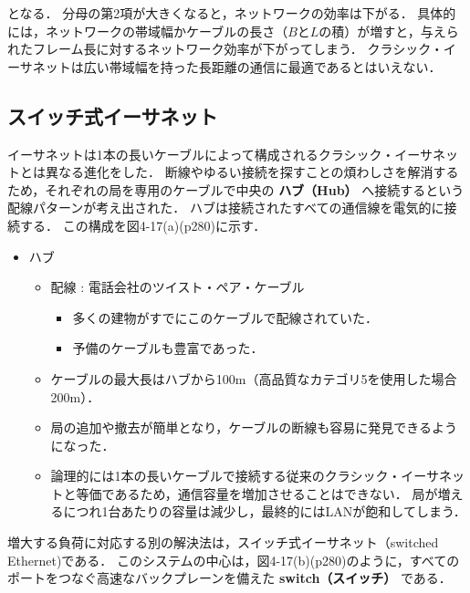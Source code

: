\documentclass[a4paper]{ltjsarticle}
\providecommand{\tightlist}{%
  \setlength{\itemsep}{0pt}\setlength{\parskip}{0pt}}
\begin{document}
となる． 分母の第2項が大きくなると，ネットワークの効率は下がる．
具体的には，ネットワークの帯域幅かケーブルの長さ（\(B\)と\(L\)の積）が増すと，与えられたフレーム長に対するネットワーク効率が下がってしまう．
クラシック・イーサネットは広い帯域幅を持った長距離の通信に最適であるとはいえない．

\subsection{スイッチ式イーサネット}\label{ux30b9ux30a4ux30c3ux30c1ux5f0fux30a4ux30fcux30b5ux30cdux30c3ux30c8}

イーサネットは1本の長いケーブルによって構成されるクラシック・イーサネットとは異なる進化をした．
断線やゆるい接続を探すことの煩わしさを解消するため，それぞれの局を専用のケーブルで中央の
\textbf{ハブ（Hub）} へ接続するという配線パターンが考え出された．
ハブは接続されたすべての通信線を電気的に接続する．
この構成を図4-17(a)(p280)に示す．

\begin{itemize}
\tightlist
\item
  ハブ

  \begin{itemize}
  \tightlist
  \item
    配線 : 電話会社のツイスト・ペア・ケーブル

    \begin{itemize}
    \tightlist
    \item
      多くの建物がすでにこのケーブルで配線されていた．
    \item
      予備のケーブルも豊富であった．
    \end{itemize}
  \item
    ケーブルの最大長はハブから100m（高品質なカテゴリ5を使用した場合200m）．
  \item
    局の追加や撤去が簡単となり，ケーブルの断線も容易に発見できるようになった．
  \item
    論理的には1本の長いケーブルで接続する従来のクラシック・イーサネットと等価であるため，通信容量を増加させることはできない．
    局が増えるにつれ1台あたりの容量は減少し，最終的にはLANが飽和してしまう．
  \end{itemize}
\end{itemize}

増大する負荷に対応する別の解決法は，スイッチ式イーサネット（switched
Ethernet)である．
このシステムの中心は，図4-17(b)(p280)のように，すべてのポートをつなぐ高速なバックプレーンを備えた
\textbf{switch（スイッチ）} である．
\end{document}
